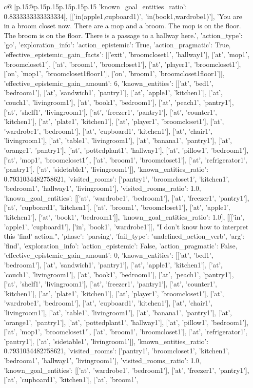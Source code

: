 \documentclass{article}
\begin{document}
{\begin{supertabular}{c@{$\;$}|p{.15\linewidth}@{}p{.15\linewidth}p{.15\linewidth}p{.15\linewidth}p{.15\linewidth}p{.15\linewidth}}
{{{'known_goal_entities_ratio': 0.8333333333333334}}], [['in(apple1,cupboard1)', 'in(book1,wardrobe1)'], 'You are in a broom closet now. There are a mop and a broom. The mop is on the floor. The broom is on the floor. There is a passage to a hallway here.', {'action_type': 'go', 'exploration_info': {'action_epistemic': True, 'action_pragmatic': True, 'effective_epistemic_gain_facts': [['exit', 'broomcloset1', 'hallway1'], ['at', 'mop1', 'broomcloset1'], ['at', 'broom1', 'broomcloset1'], ['at', 'player1', 'broomcloset1'], ['on', 'mop1', 'broomcloset1floor1'], ['on', 'broom1', 'broomcloset1floor1']], 'effective_epistemic_gain_amount': 6, 'known_entities': [['at', 'bed1', 'bedroom1'], ['at', 'sandwich1', 'pantry1'], ['at', 'apple1', 'kitchen1'], ['at', 'couch1', 'livingroom1'], ['at', 'book1', 'bedroom1'], ['at', 'peach1', 'pantry1'], ['at', 'shelf1', 'livingroom1'], ['at', 'freezer1', 'pantry1'], ['at', 'counter1', 'kitchen1'], ['at', 'plate1', 'kitchen1'], ['at', 'player1', 'broomcloset1'], ['at', 'wardrobe1', 'bedroom1'], ['at', 'cupboard1', 'kitchen1'], ['at', 'chair1', 'livingroom1'], ['at', 'table1', 'livingroom1'], ['at', 'banana1', 'pantry1'], ['at', 'orange1', 'pantry1'], ['at', 'pottedplant1', 'hallway1'], ['at', 'pillow1', 'bedroom1'], ['at', 'mop1', 'broomcloset1'], ['at', 'broom1', 'broomcloset1'], ['at', 'refrigerator1', 'pantry1'], ['at', 'sidetable1', 'livingroom1']], 'known_entities_ratio': 0.7931034482758621, 'visited_rooms': ['pantry1', 'broomcloset1', 'kitchen1', 'bedroom1', 'hallway1', 'livingroom1'], 'visited_rooms_ratio': 1.0, 'known_goal_entities': [['at', 'wardrobe1', 'bedroom1'], ['at', 'freezer1', 'pantry1'], ['at', 'cupboard1', 'kitchen1'], ['at', 'broom1', 'broomcloset1'], ['at', 'apple1', 'kitchen1'], ['at', 'book1', 'bedroom1']], 'known_goal_entities_ratio': 1.0}}], [[['in', 'apple1', 'cupboard1'], ['in', 'book1', 'wardrobe1']], "I don't know how to interpret this 'find' action.", {'phase': 'parsing', 'fail_type': 'undefined_action_verb', 'arg': 'find', 'exploration_info': {'action_epistemic': False, 'action_pragmatic': False, 'effective_epistemic_gain_amount': 0, 'known_entities': [['at', 'bed1', 'bedroom1'], ['at', 'sandwich1', 'pantry1'], ['at', 'apple1', 'kitchen1'], ['at', 'couch1', 'livingroom1'], ['at', 'book1', 'bedroom1'], ['at', 'peach1', 'pantry1'], ['at', 'shelf1', 'livingroom1'], ['at', 'freezer1', 'pantry1'], ['at', 'counter1', 'kitchen1'], ['at', 'plate1', 'kitchen1'], ['at', 'player1', 'broomcloset1'], ['at', 'wardrobe1', 'bedroom1'], ['at', 'cupboard1', 'kitchen1'], ['at', 'chair1', 'livingroom1'], ['at', 'table1', 'livingroom1'], ['at', 'banana1', 'pantry1'], ['at', 'orange1', 'pantry1'], ['at', 'pottedplant1', 'hallway1'], ['at', 'pillow1', 'bedroom1'], ['at', 'mop1', 'broomcloset1'], ['at', 'broom1', 'broomcloset1'], ['at', 'refrigerator1', 'pantry1'], ['at', 'sidetable1', 'livingroom1']], 'known_entities_ratio': 0.7931034482758621, 'visited_rooms': ['pantry1', 'broomcloset1', 'kitchen1', 'bedroom1', 'hallway1', 'livingroom1'], 'visited_rooms_ratio': 1.0, 'known_goal_entities': [['at', 'wardrobe1', 'bedroom1'], ['at', 'freezer1', 'pantry1'], ['at', 'cupboard1', 'kitchen1'], ['at', 'broom1', }}}
\end{supertabular}}
\end{document}

